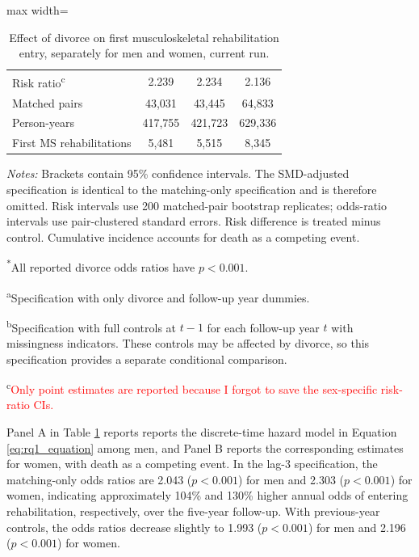 \documentclass[a4paper,12pt]{article}
\theoremstyle{plain}
\theoremstyle{definition}
\theoremstyle{TheoremNum}
\theoremstyle{CorollaryNum}
\theoremstyle{PropositionNum}
\theoremstyle{TheoremNum}
\begin{document}
\begin{table}[H]
\begin{adjustbox}{max width=\textwidth}
\begin{tabular}{@{}lccc@{}}
Risk ratio\textsuperscript{c} & 2.239 & 2.234 & 2.136 \\
\addlinespace
\hline
Matched pairs & 43,031 & 43,445 & 64,833 \\
Person-years & 417,755 & 421,723 & 629,336 \\
First MS rehabilitations & 5,481 & 5,515 & 8,345 \\
\bottomrule
\end{tabular}
\end{adjustbox}
\caption{Effect of divorce on first musculoskeletal rehabilitation entry, separately for men and women, current run.}
\label{tab:rq1_main_effect}
\begin{minipage}{\textwidth}
\footnotesize
\textit{Notes:} Brackets contain 95\% confidence intervals. The SMD-adjusted specification is identical to the matching-only specification and is therefore omitted. Risk intervals use 200 matched-pair bootstrap replicates; odds-ratio intervals use pair-clustered standard errors. Risk difference is treated minus control. Cumulative incidence accounts for death as a competing event.

\textsuperscript{*}All reported divorce odds ratios have $p<0.001$.

\textsuperscript{a}Specification with only divorce and follow-up year dummies.

\textsuperscript{b}Specification with full controls at $t-1$ for each follow-up year $t$ with missingness indicators. These controls may be affected by divorce, so this specification provides a separate conditional comparison.

\textsuperscript{c}\textcolor{red}{Only point estimates are reported because I forgot to save the sex-specific risk-ratio CIs.}
\end{minipage}
\end{table}



Panel A in Table \ref{tab:rq1_main_effect} reports reports the discrete-time hazard model in Equation \ref{eq:rq1_equation} among men, and Panel B reports the corresponding estimates for women, with death as a competing event. In the lag-3 specification, the matching-only odds ratios are 2.043 ($p < 0.001$) for men and 2.303 ($p < 0.001$) for women, indicating approximately 104\% and 130\% higher annual odds of entering rehabilitation, respectively, over the five-year follow-up. With previous-year controls, the odds ratios decrease slightly to 1.993 ($p < 0.001$) for men and 2.196 ($p < 0.001$) for women. 
\end{document}
